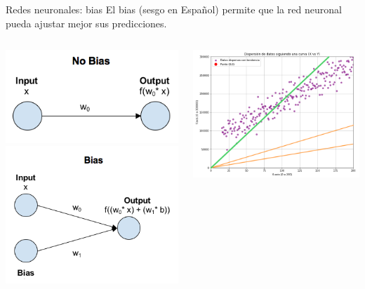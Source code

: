 \begin{frame}{Redes neuronales: bias}
El \alert{bias} (sesgo en Español) permite que la red neuronal pueda ajustar mejor sus predicciones. 
\begin{columns}[c]
\centering
\begin{column}{0.4\textwidth}
    \centering
    \includegraphics[width=\textwidth]{Slides/figures/Introduccion/bias-no.png}
    \includegraphics[width=\textwidth]{Slides/figures/Introduccion/bias-si.png}
\end{column}
\begin{column}{0.4\textwidth}
    \centering
    \includegraphics[width=\textwidth]{Slides/figures/Introduccion/bias-no-data.png}

\end{column}
\end{columns}
\end{frame}

